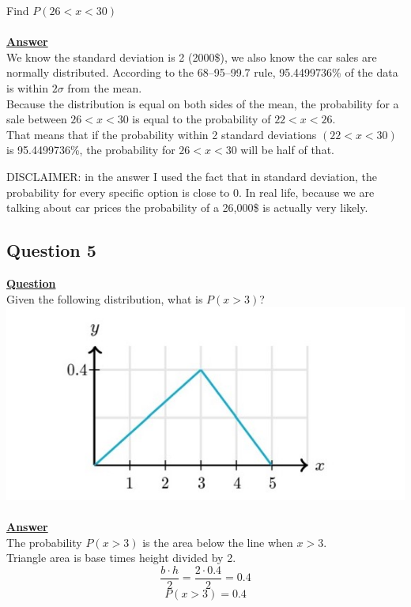 \documentclass[a4, 12pt,titlepage]{scrartcl}
\begin{document}
 Find $P(26<x<30)$\\
 \smallskip\\
 \textbf{\underline{Answer}}\\
We know the standard deviation is 2 (2000\$), we also know the car sales are normally distributed. According to the 68–95–99.7 rule, 95.4499736\% of the data is within $2\sigma$ from the mean.\\
Because the distribution is equal on both sides of the mean, the probability for a sale between $26<x<30$ is equal to the probability of $22<x<26$.\\
That means that if the probability within 2 standard deviations $(22<x<30)$ is 95.4499736\%, the probability for $26<x<30$ will be half of that.\\
\begin{center}
\end{center}
DISCLAIMER: in the answer I used the fact that in standard deviation, the probability for every specific option is close to 0.
In real life, because we are talking about car prices the probability of a 26,000\$ is actually very likely.
\newpage

\subsection{Question 5}
\textbf{\underline{Question}}\\
Given the following distribution, what is $P(x>3)$?\\
\includegraphics{DSgraph1.jpg}\\
\smallskip\\
\textbf{\underline{Answer}}\\
The probability $P(x>3)$ is the area below the line when $x>3$.\\
Triangle area is base times height divided by 2.\[
\frac{b\cdot h}{2}=\frac{2\cdot 0.4}{2}=0.4
\]
\[
\boxed{P(x>3)=0.4}
\]
 \newpage
\end{document}
